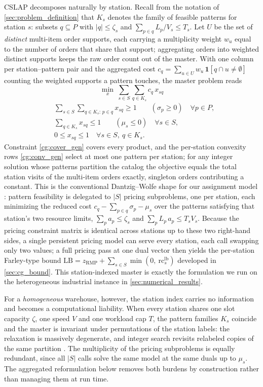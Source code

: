 \documentclass[preprint,review,11pt,authoryear]{elsarticle}
\begin{document}
CSLAP decomposes naturally by station. Recall from the notation of \cref{sec:problem_definition} that $K_s$ denotes the family of feasible patterns for station $s$: subsets $q \subseteq P$ with $|q| \le \zeta_s$ and $\sum_{p \in q} L_p / V_s \le T_s$. Let $U$ be the set of \emph{distinct} multi-item order supports, each carrying a multiplicity weight $w_u$ equal to the number of orders that share that support; aggregating orders into weighted distinct supports keeps the raw order count out of the master. With one column per station--pattern pair and the aggregated cost $c_q = \sum_{u \in U} w_u\,\mathbf{1}[q \cap u \neq \emptyset]$ counting the weighted supports a pattern touches, the master problem reads
\[
\min_{x}\ \sum_{s \in S} \sum_{q \in K_s} c_q\, x_{sq}
\]
\begin{align}
& \sum_{s \in S} \sum_{q \in K_s:\, p \in q} x_{sq} \ge 1 \qquad (\sigma_p \ge 0) \quad \forall p \in P, \label{cg:cover_gen}\\
& \sum_{q \in K_s} x_{sq} \le 1 \qquad (\mu_s \le 0) \quad \forall s \in S, \label{cg:conv_gen}\\
& 0 \le x_{sq} \le 1 \quad \forall s \in S,\ q \in K_s. \nonumber
\end{align}
Constraint \eqref{cg:cover_gen} covers every product, and the per-station convexity rows \eqref{cg:conv_gen} select at most one pattern per station; for any integer solution whose patterns partition the catalog the objective equals the total station visits of the multi-item orders exactly, singleton orders contributing a constant. This is the conventional Dantzig--Wolfe shape for our assignment model \cite{lubbecke2005selected, desrochers1989column}: pattern feasibility is delegated to $|S|$ pricing subproblems, one per station, each minimizing the reduced cost $c_q - \sum_{p \in q} \sigma_p - \mu_s$ over the patterns satisfying that station's two resource limits, $\sum_p a_p \le \zeta_s$ and $\sum_p L_p\, a_p \le T_s V_s$. Because the pricing constraint matrix is identical across stations up to these two right-hand sides, a single persistent pricing model can serve every station, each call swapping only two values; a full pricing pass at one dual vector then yields the per-station Farley-type bound $\mathrm{LB} = z_{\mathrm{RMP}} + \sum_{s \in S} \min(0,\ \mathrm{rc}^{\mathrm{lb}}_s)$ developed in \cref{sec:cg_bound}. This station-indexed master is exactly the formulation we run on the heterogeneous industrial instance in \cref{sec:numerical_results}.

For a \emph{homogeneous} warehouse, however, the station index carries no information and becomes a computational liability. When every station shares one slot capacity $\zeta$, one speed $V$ and one workload cap $T$, the pattern families $K_s$ coincide and the master is invariant under permutations of the station labels: the relaxation is massively degenerate, and integer search revisits relabeled copies of the same partition \cite{vanderbeck2000dw}. The multiplicity of the pricing subproblems is equally redundant, since all $|S|$ calls solve the same model at the same duals up to $\mu_s$. The aggregated reformulation below removes both burdens by construction rather than managing them at run time.
\end{document}
